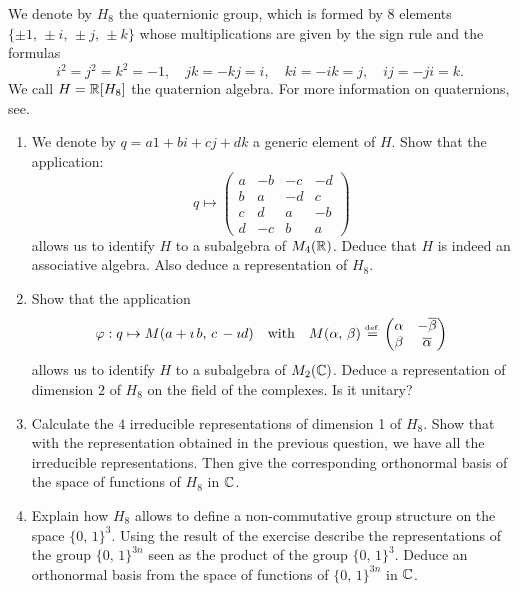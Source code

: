  
\begin{exo}
\label{exo-grpe-quaternionique}
     We denote by $ H_8 $ the quaternionic group, which is formed by $ 8 $ elements $ \{\pm 1, \, \pm i, \, \pm j, \, \pm k\} $ whose multiplications are given by the sign rule and the formulas
\begin{equation*}
i^2 = j^2 = k^2 = -1, \quad jk = - kj = i, \quad ki = - ik = j, \quad ij = -ji = k.
\end{equation*}
We call $ H = \mathbb{R} [H_8] $ the quaternion algebra. For more information on quaternions, see{\upshape \cite{perrin}}. \begin{enumerate}
\item We denote by $ q = a 1 + bi + cj + dk $ a generic element of $ H $. Show that the application:
\begin{equation*}
q \mapsto \begin{pmatrix} a & -b & -c & -d \\b & a & -d & c \\c & d & a & -b \\d & -c & b & a \end{pmatrix}
\end{equation*}
allows us to identify $ H $ to a subalgebra of $ M_4 (\mathbb{R}) $. Deduce that $ H $ is indeed an associative algebra. Also deduce a representation of $ H_8 $.
\item {} Show that the application
\begin{equation*}
\varphi: q \mapsto M (a + \imath \, b, \, c \, - \imath d) \quad \text{with} \quad M (\alpha, \, \beta) \stackrel{\mbox{\upshape\tiny def.}}{=} \begin{pmatrix} \alpha & - \overline{\beta} \\\beta & \overline{\alpha} \end{pmatrix}
\end{equation*}
allows us to identify $ H $ to a subalgebra of $ M_2 (\mathbb{C}) $. Deduce a representation of dimension $ 2 $ of $ H_8 $ on the field of the complexes. Is it unitary?
\item Calculate the $ 4 $ irreducible representations of dimension 1 of $ H_8 $. Show that with the representation obtained in the previous question, we have all the irreducible representations. Then give the corresponding orthonormal basis of the space of functions of $ H_8 $ in $ \mathbb{C} $.
\item Explain how $ H_8 $ allows to define a non-commutative group structure on the space $ \{0, \, 1\}^3 $. Using the result of the exercise  describe the representations of the group $ \{0, \, 1\}^{3n} $ seen as the product of the group $ \{0, \, 1\}^3$. Deduce an orthonormal basis from the space of functions of $ \{0, \, 1\}^{3n} $ in $ \mathbb{C} $.

\end{enumerate}
\end{exo}
